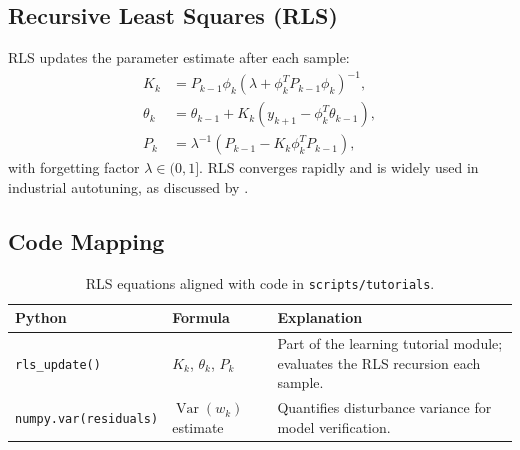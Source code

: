 \subsection{Recursive Least Squares (RLS)}
RLS updates the parameter estimate after each sample:
\begin{align}
    K_k &= P_{k-1} \phi_k (\lambda + \phi_k^T P_{k-1} \phi_k)^{-1},\\
    \theta_k &= \theta_{k-1} + K_k (y_{k+1} - \phi_k^T \theta_{k-1}),\\
    P_k &= \lambda^{-1} (P_{k-1} - K_k \phi_k^T P_{k-1}),
\end{align}
with forgetting factor $\lambda \in (0, 1]$. RLS converges rapidly and is widely used in industrial autotuning, as discussed by \textcite{astrom1995pid}.

\subsection{Code Mapping}
\begin{table}[h]
    \centering
    \small
    \renewcommand{\arraystretch}{1.2}
    \begin{tabularx}{\linewidth}{|>{\raggedright\arraybackslash}p{4cm}|X|X|}
        \hline
        \textbf{Python} & \textbf{Formula} & \textbf{Explanation} \\
        \hline
        \texttt{rls\_update()} & $K_k$, $\theta_k$, $P_k$ & Part of the learning tutorial module; evaluates the RLS recursion each sample. \\
        \hline
        \texttt{numpy.var(residuals)} & $\operatorname{Var}(w_k)$ estimate & Quantifies disturbance variance for model verification. \\
        \hline
    \end{tabularx}
    \caption{RLS equations aligned with code in \texttt{scripts/tutorials}.}
\end{table}

